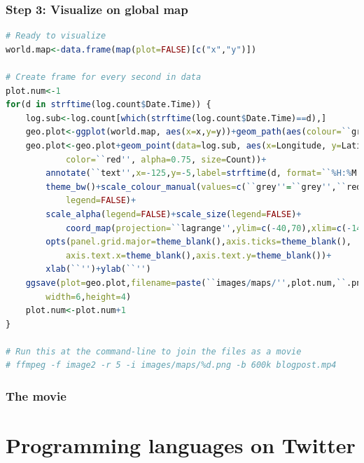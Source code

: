 \documentclass[xcolor=dvipsnames, 9pt,handout]{beamer}
\begin{document}
\begin{frame}[fragile]
    \frametitle{Step 3: Visualize on global map}
    \scriptsize{\begin{lstlisting}[language=R]
# Ready to visualize
world.map<-data.frame(map(plot=FALSE)[c("x","y")])

# Create frame for every second in data
plot.num<-1
for(d in strftime(log.count$Date.Time)) {
    log.sub<-log.count[which(strftime(log.count$Date.Time)==d),]
    geo.plot<-ggplot(world.map, aes(x=x,y=y))+geom_path(aes(colour=``grey''))
    geo.plot<-geo.plot+geom_point(data=log.sub, aes(x=Longitude, y=Latitude, 
            color=``red'', alpha=0.75, size=Count))+
        annotate(``text'',x=-125,y=-5,label=strftime(d, format=``%H:%M:%S''))+
        theme_bw()+scale_colour_manual(values=c(``grey''=``grey'',``red''=``red''),
            legend=FALSE)+
        scale_alpha(legend=FALSE)+scale_size(legend=FALSE)+
            coord_map(projection=``lagrange'',ylim=c(-40,70),xlim=c(-145,155))+
        opts(panel.grid.major=theme_blank(),axis.ticks=theme_blank(),
            axis.text.x=theme_blank(),axis.text.y=theme_blank())+
        xlab(``'')+ylab(``'')
    ggsave(plot=geo.plot,filename=paste(``images/maps/'',plot.num,``.png'',sep=``''),
        width=6,height=4)
    plot.num<-plot.num+1
}

# Run this at the command-line to join the files as a movie
# ffmpeg -f image2 -r 5 -i images/maps/%d.png -b 600k blogpost.mp4
    \end{lstlisting}}
\end{frame}

\begin{frame}[fragile]
    \frametitle{The movie}
    \begin{center}
    \end{center}
\end{frame}


\section{Programming languages on Twitter} %
\label{sec:comparison_of_programming_language_tweeting}
\end{document}
